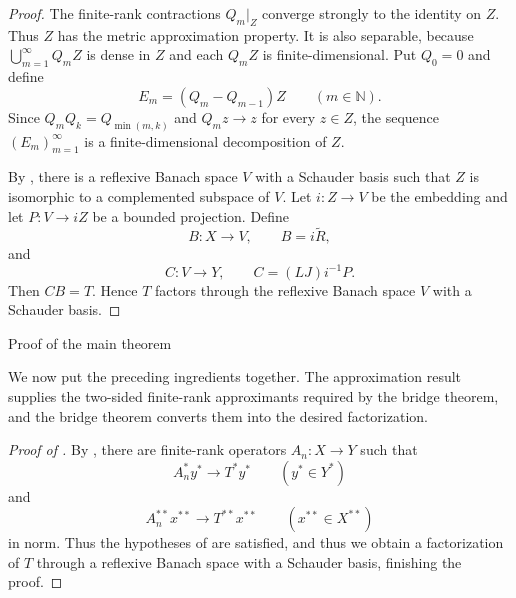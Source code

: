 \documentclass[11pt,reqno]{amsart}
\makeatletter
\theoremstyle{plain}
\theoremstyle{definition}
\newcounter{problempaper}
\newenvironment{problempaperbody}{%
  \setcounter{subsection}{0}%
  \setcounter{subsubsection}{0}%
  \setcounter{paragraph}{0}%
  \renewcommand{\thesubsection}{\arabic{subsection}}%
  \renewcommand{\thesubsubsection}{\thesubsection.\arabic{subsubsection}}%
  \renewcommand{\theparagraph}{\thesubsubsection.\arabic{paragraph}}%
  \let\problem@outersection\section
  \let\problem@outersubsection\subsection
  \let\problem@outersubsubsection\subsubsection
  \let\problem@outerparagraph\paragraph
  \let\section\problem@papersection
  \let\subsection\problem@papersubsection
  \let\subsubsection\problem@papersubsubsection
}{%
  \let\section\problem@outersection
  \let\subsection\problem@outersubsection
  \let\subsubsection\problem@outersubsubsection
  \let\paragraph\problem@outerparagraph
}
\newcommand{\problem@target}[2]{%
  \hypertarget{problem-\theproblempaper-#1-#2}{}%
}
\newcommand{\problem@paperheading}[3]{%
  \par\bigskip
  \problem@target{#1}{#2}%
  \noindent{\large\bfseries #2.\quad #3\par}%
  \nobreak\smallskip
}
\newcommand{\problem@papersubheading}[3]{%
  \par\medskip
  \problem@target{#1}{#2}%
  \noindent{\normalsize\bfseries #2.\quad #3\par}%
  \nobreak\smallskip
}
\newcommand{\problem@papersubsubheading}[3]{%
  \par\smallskip
  \problem@target{#1}{#2}%
  \noindent{\normalsize\itshape #2.\quad #3.\ }%
}
\def\problem@papersection{%
  \@ifstar{\problem@papersectionstar}{\problem@papersectionnostar}%
}
\def\problem@papersectionstar#1{%
  \par\bigskip\noindent{\large\bfseries #1\par}\nobreak\smallskip
}
\def\problem@papersectionnostar#1{%
  \refstepcounter{subsection}%
  \setcounter{subsubsection}{0}%
  \setcounter{paragraph}{0}%
  \problem@paperheading{section}{\thesubsection}{#1}%
  \problem@writecontentsline{section}{\thesubsection}{#1}%
}
\def\problem@papersubsection{%
  \@ifstar{\problem@papersubsectionstar}{\problem@papersubsectionnostar}%
}
\def\problem@papersubsectionstar#1{%
  \par\medskip\noindent{\normalsize\bfseries #1\par}\nobreak\smallskip
}
\def\problem@papersubsectionnostar#1{%
  \refstepcounter{subsubsection}%
  \setcounter{paragraph}{0}%
  \problem@papersubheading{subsection}{\thesubsubsection}{#1}%
  \problem@writecontentsline{subsection}{\thesubsubsection}{#1}%
}
\def\problem@papersubsubsection{%
  \@ifstar{\problem@papersubsubsectionstar}{\problem@papersubsubsectionnostar}%
}
\def\problem@papersubsubsectionstar#1{%
  \par\smallskip\noindent{\normalsize\itshape #1.\ }%
}
\def\problem@papersubsubsectionnostar#1{%
  \refstepcounter{paragraph}%
  \problem@papersubsubheading{subsubsection}{\theparagraph}{#1}%
  \problem@writecontentsline{subsubsection}{\theparagraph}{#1}%
}
\newcommand{\problem@writecontentsline}[3]{%
  \begingroup
  \protected@write\@auxout{}{%
    \string\problemcontentsentry{\theproblempaper}{#1}{#2}{#3}{\thepage}%
  }%
  \endgroup
}
\newcommand{\problemcontentsentry}[5]{%
  \@ifundefined{problemcontents@#1}{%
    \expandafter\gdef\csname problemcontents@#1\endcsname{}%
  }{}%
  \expandafter\g@addto@macro\csname problemcontents@#1\endcsname{%
    \problemcontentsline{#1}{#2}{#3}{#4}{#5}%
  }%
}
\newcommand{\problemcontentslink}[4]{%
  \hyperlink{problem-#1-#2-#3}{#4}%
}
\newcommand{\problemcontentsline}[5]{%
  \ifstrequal{#2}{section}{%
    \par\noindent
    \problemcontentslink{#1}{#2}{#3}{\makebox[2.5em][l]{#3}#4}%
    \nobreak\dotfill
    \problemcontentslink{#1}{#2}{#3}{#5}\par
  }{%
    \ifstrequal{#2}{subsection}{%
      \par\noindent\hspace*{1.5em}%
      \problemcontentslink{#1}{#2}{#3}{\makebox[3.5em][l]{#3}#4}%
      \nobreak\dotfill
      \problemcontentslink{#1}{#2}{#3}{#5}\par
    }{%
      \par\noindent\hspace*{3em}%
      \problemcontentslink{#1}{#2}{#3}{\makebox[4.5em][l]{#3}#4}%
      \nobreak\dotfill
      \problemcontentslink{#1}{#2}{#3}{#5}\par
    }%
  }%
}
\makeatother
\begin{document}
\begin{problempaperbody}
\begin{proof}
The finite-rank contractions $Q_m|_Z$ converge strongly to the identity on $Z$. Thus $Z$ has the metric approximation property. It is also separable, because $\bigcup_{m=1}^{\infty}Q_mZ$ is dense in $Z$ and each $Q_mZ$ is finite-dimensional. Put $Q_0=0$ and define
\begin{equation*}
        E_m=(Q_m-Q_{m-1})Z \qquad (m\in\mathbb N).
\end{equation*}
Since $Q_mQ_k=Q_{\min(m,k)}$ and $Q_mz\to z$ for every $z\in Z$, the sequence $(E_m)_{m=1}^{\infty}$ is a finite-dimensional decomposition of $Z$.

By , there is a reflexive Banach space $V$ with a Schauder basis such that $Z$ is isomorphic to a complemented subspace of $V$. Let $i\colon Z\to V$ be the embedding and let $P\colon V\to iZ$ be a bounded projection. Define
\begin{equation*}
        B\colon X\to V,\qquad B=i\widetilde R,
\end{equation*}
and
\begin{equation*}
        C\colon V\to Y,\qquad C=(LJ)i^{-1}P.
\end{equation*}
Then $CB=T$. Hence $T$ factors through the reflexive Banach space $V$ with a Schauder basis.
\end{proof}


\section{Proof of the main theorem}
\label{p5:sec:conclusion}

We now put the preceding ingredients together. The approximation result supplies the two-sided finite-rank approximants required by the bridge theorem, and the bridge theorem converts them into the desired factorization.

\begin{proof}[Proof of ]
By , there are finite-rank operators $A_n\colon X\to Y$ such that
\begin{equation*}
        A_n^*y^*\to T^*y^* \qquad (y^*\in Y^*)
\end{equation*}
and
\begin{equation*}
        A_n^{**}x^{**}\to T^{**}x^{**} \qquad (x^{**}\in X^{**})
\end{equation*}
in norm. Thus the hypotheses of  are satisfied, and thus we obtain a factorization of $T$ through a reflexive Banach space with a Schauder basis, finishing the proof.
\end{proof}

\end{problempaperbody}
\end{document}
